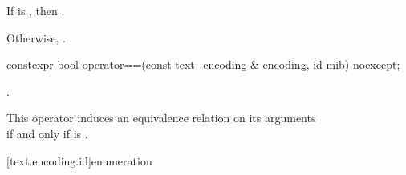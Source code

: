 \documentclass{wg21}
\begin{document}
\begin{addedblock}
\begin{itemdescr}
    If  is , then .

    Otherwise, .

\end{itemdescr}

\begin{itemdecl}
    constexpr bool operator==(const text_encoding & encoding, id mib) noexcept;
\end{itemdecl}

\begin{itemdescr}
    \returns {}.

    \remarks This operator induces an equivalence relation on its arguments\\
    if and only if  is .
\end{itemdescr}

[text.encoding.id]{enumeration }


\end{addedblock}
\end{document}
